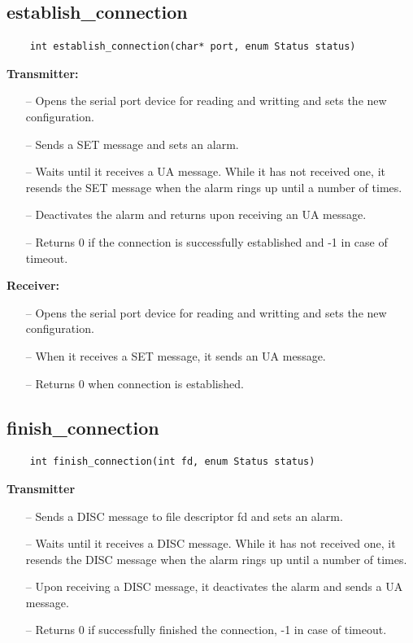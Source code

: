 \documentclass[11pt]{report}
\begin{document}
\subsection{establish\_connection}
\begin{verbatim}
    int establish_connection(char* port, enum Status status)
\end{verbatim}

\textbf{Transmitter:}
\begin{itemize}
    \item[--] Opens the serial port device for reading and writting and sets the new configuration.
    \item[--] Sends a SET message and sets an alarm.
    \item[--] Waits until it receives a UA message. While it has not received one, it resends the SET message when the alarm rings up until a number of times.
    \item[--] Deactivates the alarm and returns upon receiving an UA message.
    \item[--] Returns 0 if the connection is successfully established and -1 in case of timeout.
\end{itemize}

\textbf{Receiver:}
\begin{itemize}
    \item[--] Opens the serial port device for reading and writting and sets the new configuration.
    \item[--] When it receives a SET message, it sends an UA message.
    \item[--] Returns 0 when connection is established.
\end{itemize}

\subsection{finish\_connection}

\begin{verbatim}
    int finish_connection(int fd, enum Status status)
\end{verbatim}

\textbf{Transmitter}
\begin{itemize}
    \item[--] Sends a DISC message to file descriptor fd and sets an alarm.
    \item[--] Waits until it receives a DISC message. While it has not received one, it resends the DISC message when the alarm rings up until a number of times.
    \item[--] Upon receiving a DISC message, it deactivates the alarm and sends a UA message.
    \item[--] Returns 0 if successfully finished the connection, -1 in case of timeout.
\end{itemize}
\end{document}
